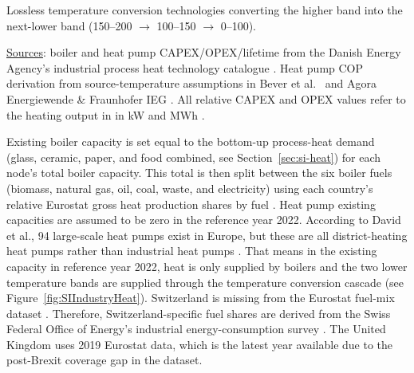 \begin{table}[h!]
\begin{threeparttable}
\begin{tabular}{lcrrrcc}
		\bottomrule
	\end{tabular}
	\begin{tablenotes}
		\footnotesize
		\item[a] Lossless temperature conversion technologies converting the higher band into the next-lower band (150--200 $\to$ 100--150 $\to$ 0--100). 
		\item[] \underline{Sources}: boiler and heat pump CAPEX/OPEX/lifetime from the Danish Energy Agency's industrial process heat technology catalogue \cite{DEA_IndustrialHeat}. Heat pump COP derivation from source-temperature assumptions in Bever et al.\ \cite{Bever2024} and Agora Energiewende \& Fraunhofer IEG \cite{Agora_IGE2023}. All relative CAPEX and OPEX values refer to the heating output in in kW and MWh \cite{DEA_IndustrialHeat}. 
	\end{tablenotes}
	\end{threeparttable}
\end{table}

Existing boiler capacity is set equal to the bottom-up process-heat demand (glass, ceramic, paper, and food combined, see Section~\ref{sec:si-heat}) for each node's total boiler capacity. This total is then split between the six boiler fuels (biomass, natural gas, oil, coal, waste, and electricity) using each country's relative Eurostat gross heat production shares by fuel \cite{Eurostat2022}. Heat pump existing capacities are assumed to be zero in the reference year 2022. According to David et al., 94 large-scale heat pumps exist in Europe, but these are all district-heating heat pumps rather than industrial heat pumps \cite{David2017}. That means in the existing capacity in reference year 2022, heat is only supplied by boilers and the two lower temperature bands are supplied through the temperature conversion cascade (see Figure~\ref{fig:SIIndustryHeat}). Switzerland is missing from the Eurostat fuel-mix dataset \cite{Eurostat2022}. Therefore, Switzerland-specific fuel shares are derived from the Swiss Federal Office of Energy's industrial energy-consumption survey \cite{BFE2025}. The United Kingdom uses 2019 Eurostat data, which is the latest year available due to the post-Brexit coverage gap in the dataset. \\

